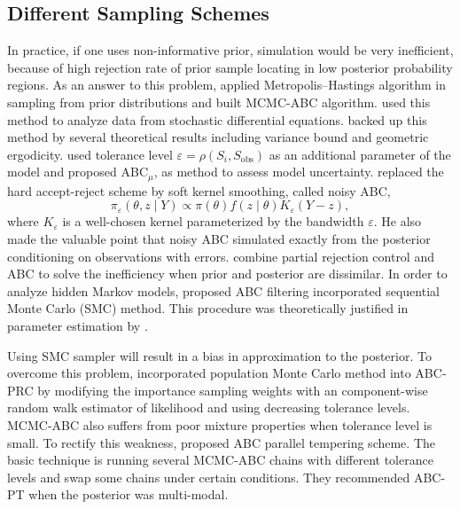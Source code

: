 \subsection{Different Sampling Schemes}

In practice, if one uses non-informative prior, simulation would be
very inefficient, because of high rejection rate of prior sample locating
in low posterior probability regions. As an answer to this problem,
\citet{marjoram2003markov} applied Metropolis--Hastings algorithm
in sampling from prior distributions and built MCMC-ABC algorithm.
\citet{picchini2014inference} used this method to analyze data from
stochastic differential equations. \citet{lee2014variance} backed
up this method by several theoretical results including variance bound
and geometric ergodicity. \citet{ratmann2009model} used tolerance
level $\varepsilon=\rho\left(S_{i},S_{\mathrm{obs}}\right)$ as an
additional parameter of the model and proposed ABC$_{\mu}$, as method
to assess model uncertainty. \citet{wilkinson2013approximate} replaced
the hard accept-reject scheme by soft kernel smoothing, called noisy
ABC, 
\[
\pi_{\varepsilon}\left(\theta,z\mid Y\right)\propto\pi\left(\theta\right)f\left(z\mid\theta\right)K_{\varepsilon}\left(Y-z\right),
\]
where $K_{\varepsilon}$ is a well-chosen kernel parameterized by
the bandwidth $\varepsilon$. He also made the valuable point that
noisy ABC simulated exactly from the posterior conditioning on observations
with errors. \citet{sisson2007sequential} combine partial rejection
control and ABC to solve the inefficiency when prior and posterior
are dissimilar. In order to analyze hidden Markov models, \citet{jasra2012filtering}
proposed ABC filtering incorporated sequential Monte Carlo (SMC) method.
This procedure was theoretically justified in parameter estimation by
\citet{dean2014parameter}. %
\begin{comment}
detail of justification
\end{comment}
Using SMC sampler will result in a bias in approximation to the posterior.
To overcome this problem, \citet{beaumont2009adaptive} incorporated
population Monte Carlo method into ABC-PRC by modifying the importance
sampling weights with an component-wise random walk estimator of likelihood
and using decreasing tolerance levels. MCMC-ABC also suffers from
poor mixture properties when tolerance level is small. To rectify this
weakness, \citet{baragatti2013likelihood} proposed ABC parallel tempering
scheme. The basic technique is running several MCMC-ABC chains with
different tolerance levels and swap some chains under certain conditions.
They recommended ABC-PT when the posterior was multi-modal. 


